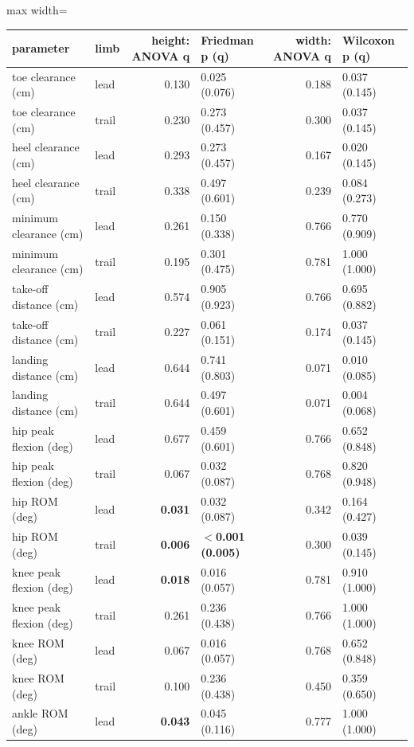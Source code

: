 \begin{adjustbox}{max width=\textwidth}
{\scriptsize
\begin{tabular}{llrlrl}
\toprule
\textbf{parameter} & \textbf{limb} & \textbf{height: ANOVA q} & \textbf{Friedman p (q)} & \textbf{width: ANOVA q} & \textbf{Wilcoxon p (q)} \\
\midrule
toe clearance (cm) & lead & 0.130 & 0.025 (0.076) & 0.188 & 0.037 (0.145) \\
toe clearance (cm) & trail & 0.230 & 0.273 (0.457) & 0.300 & 0.037 (0.145) \\
heel clearance (cm) & lead & 0.293 & 0.273 (0.457) & 0.167 & 0.020 (0.145) \\
heel clearance (cm) & trail & 0.338 & 0.497 (0.601) & 0.239 & 0.084 (0.273) \\
minimum clearance (cm) & lead & 0.261 & 0.150 (0.338) & 0.766 & 0.770 (0.909) \\
minimum clearance (cm) & trail & 0.195 & 0.301 (0.475) & 0.781 & 1.000 (1.000) \\
take-off distance (cm) & lead & 0.574 & 0.905 (0.923) & 0.766 & 0.695 (0.882) \\
take-off distance (cm) & trail & 0.227 & 0.061 (0.151) & 0.174 & 0.037 (0.145) \\
landing distance (cm) & lead & 0.644 & 0.741 (0.803) & 0.071 & 0.010 (0.085) \\
landing distance (cm) & trail & 0.644 & 0.497 (0.601) & 0.071 & 0.004 (0.068) \\
hip peak flexion (deg) & lead & 0.677 & 0.459 (0.601) & 0.766 & 0.652 (0.848) \\
hip peak flexion (deg) & trail & 0.067 & 0.032 (0.087) & 0.768 & 0.820 (0.948) \\
hip ROM (deg) & lead & \textbf{0.031} & 0.032 (0.087) & 0.342 & 0.164 (0.427) \\
hip ROM (deg) & trail & \textbf{0.006} & \textbf{$<$0.001 (0.005)} & 0.300 & 0.039 (0.145) \\
knee peak flexion (deg) & lead & \textbf{0.018} & 0.016 (0.057) & 0.781 & 0.910 (1.000) \\
knee peak flexion (deg) & trail & 0.261 & 0.236 (0.438) & 0.766 & 1.000 (1.000) \\
knee ROM (deg) & lead & 0.067 & 0.016 (0.057) & 0.768 & 0.652 (0.848) \\
knee ROM (deg) & trail & 0.100 & 0.236 (0.438) & 0.450 & 0.359 (0.650) \\
ankle ROM (deg) & lead & \textbf{0.043} & 0.045 (0.116) & 0.777 & 1.000 (1.000) \\

\end{tabular}}
\end{adjustbox}
